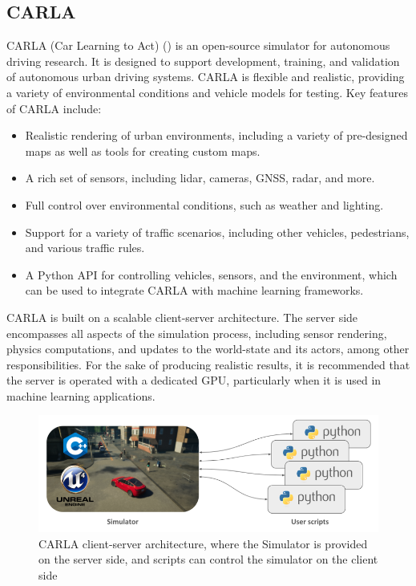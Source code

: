 
\subsection{CARLA}

CARLA (Car Learning to Act) (\cite{dosovitskiy2017carla}) is an open-source simulator for autonomous driving research. It is designed to support development, training, and validation of autonomous urban driving systems. CARLA is flexible and realistic, providing a variety of environmental conditions and vehicle models for testing. Key features of CARLA include:

\begin{itemize}
\item Realistic rendering of urban environments, including a variety of pre-designed maps as well as tools for creating custom maps.
\item A rich set of sensors, including lidar, cameras, GNSS, radar, and more.
\item Full control over environmental conditions, such as weather and lighting.
\item Support for a variety of traffic scenarios, including other vehicles, pedestrians, and various traffic rules.
\item A Python API for controlling vehicles, sensors, and the environment, which can be used to integrate CARLA with machine learning frameworks.
\end{itemize}

CARLA is built on a scalable client-server architecture. The server side encompasses all aspects of the simulation process, including sensor rendering, physics computations, and updates to the world-state and its actors, among other responsibilities. For the sake of producing realistic results, it is recommended that the server is operated with a dedicated GPU, particularly when it is used in machine learning applications.


\begin{figure}[H]
\centering
\includegraphics[width=1\linewidth]{Figures/Methods/carla_modules.png}
\caption{CARLA client-server architecture, where the Simulator is provided on the server side, and scripts can control the simulator on the client side}
\label{fig:carla_modules}
\end{figure}

